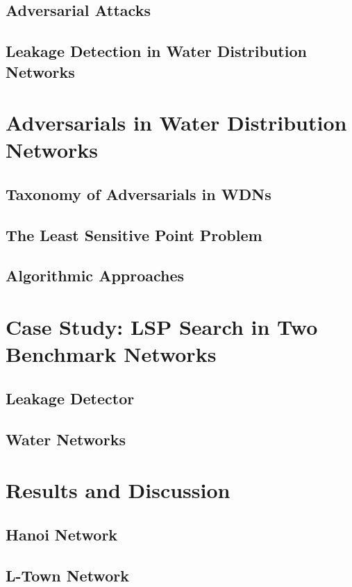 \documentclass[runningheads]{llncs}
\begin{document}
\subsection{Adversarial Attacks}

\subsection{Leakage Detection in Water Distribution Networks}

\section{Adversarials in Water Distribution Networks}
\label{sec:adversarials_in_wdns}
\subsection{Taxonomy of Adversarials in WDNs}

\subsection{The Least Sensitive Point Problem}

\subsection{Algorithmic Approaches}

\section{Case Study: LSP Search in Two Benchmark Networks}
\label{sec:case_study}
\subsection{Leakage Detector}

\subsection{Water Networks}

\section{Results and Discussion}
\label{sec:results}
\subsection{Hanoi Network}

\subsection{L-Town Network}

\end{document}
